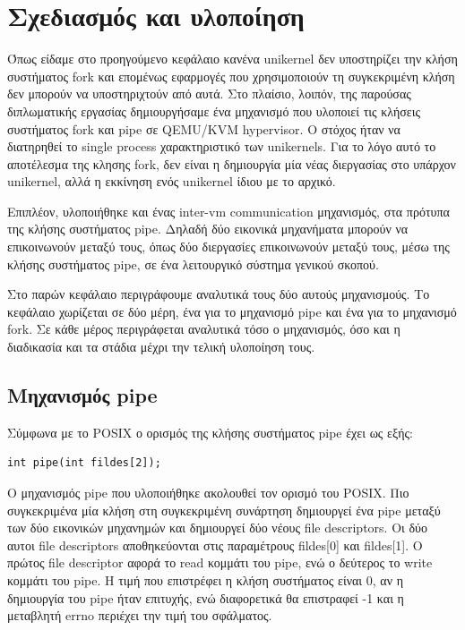\chapter{Σχεδιασμός και υλοποίηση}
\label{chap:implementation}

Όπως είδαμε στο προηγούμενο κεφάλαιο κανένα unikernel  δεν υποστηρίζει
την κλήση συστήματος fork και επομένως εφαρμογές που χρησιμοποιούν τη
συγκεκριμένη κλήση δεν μπορούν να υποστηριχτούν από αυτά. Στο πλαίσιο, λοιπόν,
της παρούσας διπλωματικής εργασίας δημιουργήσαμε ένα μηχανισμό που
υλοποιεί τις κλήσεις συστήματος fork και pipe σε QEMU/KVM hypervisor. Ο στόχος ήταν
να διατηρηθεί το single process χαρακτηριστικό των unikernels. Για το λόγο
αυτό το αποτέλεσμα της κλησης fork, δεν είναι η δημιουργία μία νέας διεργασίας
στο υπάρχον unikernel, αλλά η εκκίνηση ενός unikernel ίδιου με το αρχικό. 

Επιπλέον, υλοποιήθηκε και ένας inter-vm communication μηχανισμός, στα πρότυπα
της κλήσης συστήματος pipe. Δηλαδή δύο εικονικά μηχανήματα μπορούν να
επικοινωνούν μεταξύ τους, όπως δύο διεργασίες επικοινωνούν μεταξύ τους, μέσω της
κλήσης συστήματος pipe, σε ένα λειτουργικό σύστημα γενικού σκοπού. 

Στο παρών κεφάλαιο περιγράφουμε αναλυτικά τους δύο αυτούς μηχανισμούς. Το
κεφάλαιο χωρίζεται σε δύο μέρη, ένα για το μηχανισμό pipe και ένα για το
μηχανισμό fork. Σε κάθε μέρος περιγράφεται αναλυτικά τόσο ο μηχανισμός, όσο και
η διαδικασία και τα στάδια μέχρι την τελική υλοποίηση τους.

\newpage
\section{Μηχανισμός pipe}

Σύμφωνα με το POSIX ο ορισμός της κλήσης συστήματος pipe έχει ως εξής:
\begin{lstlisting}[numbers=none,  xleftmargin=.2\textwidth, xrightmargin=.2\textwidth]
int pipe(int fildes[2]);
\end{lstlisting}
Ο μηχανισμός pipe που υλοποιήθηκε ακολουθεί τον ορισμό του
POSIX. Πιο συγκεκριμένα μία κλήση στη συγκεκριμένη συνάρτηση δημιουργεί ένα pipe
μεταξύ των δύο εικονικών μηχανημών και δημιουργεί δύο νέους file descriptors.
Οι δύο αυτοι file descriptors αποθηκεύονται στις παραμέτρους fildes[0] και
fildes[1]. Ο πρώτος file descriptor αφορά το read κομμάτι του pipe, ενώ ο
δεύτερος το write κομμάτι του pipe. Η τιμή που επιστρέφει η κλήση συστήματος
είναι 0, αν η δημιουργία του pipe ήταν επιτυχής, ενώ διαφορετικά θα επιστραφεί
-1 και η μεταβλητή errno περιέχει την τιμή του σφάλματος.

